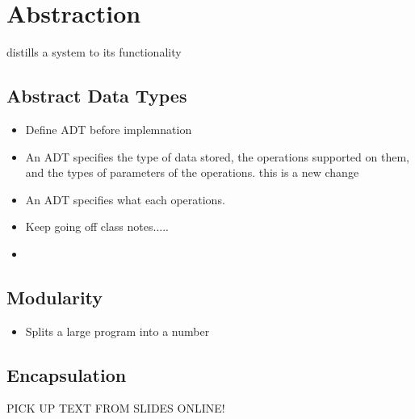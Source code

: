 \documentclass{article}
\begin{document}
\section{Abstraction}
distills a system to its functionality
\subsection{Abstract Data Types}
\begin{itemize}
\item Define ADT before implemnation
\item An ADT specifies the type of data stored, the operations supported on them, and the types of parameters of the operations.
this is a new change
\item An ADT specifies what each operations.
\item Keep going off class notes.....\item
\end{itemize}

\subsection{Modularity}
\begin{itemize}
\item Splits a large program into a number
\end{itemize}

\subsection{Encapsulation}
PICK UP TEXT FROM SLIDES ONLINE!
\end{document}
